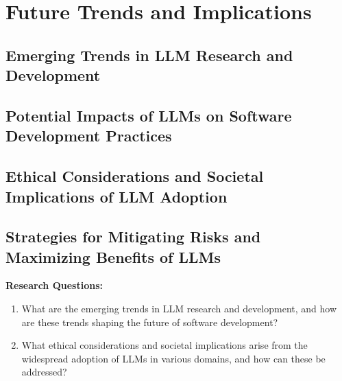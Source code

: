 
\chapter{Future Trends and Implications}
\label{chap:future_trends}
\pagestyle{fancy}

\section{Emerging Trends in LLM Research and Development}

\section{Potential Impacts of LLMs on Software Development Practices}

\section{Ethical Considerations and Societal Implications of LLM Adoption}

\section{Strategies for Mitigating Risks and Maximizing Benefits of LLMs}

\textbf{Research Questions:}
\begin{enumerate}
    \item What are the emerging trends in LLM research and development, and how are these trends shaping the future of software development?
    \item What ethical considerations and societal implications arise from the widespread adoption of LLMs in various domains, and how can these be addressed?
\end{enumerate}
